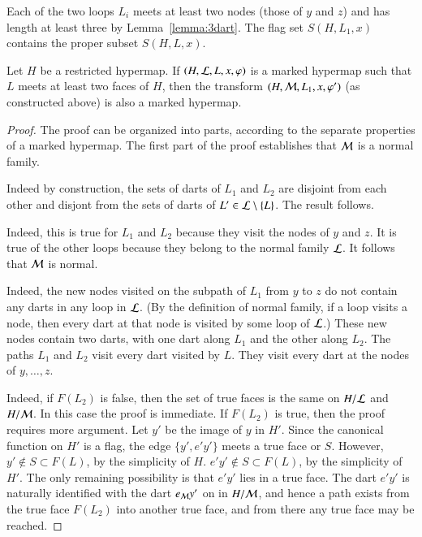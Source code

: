 Each of the two
loops $L_i$ meets at least two nodes (those
of $y$ and $z$) and has length at least three by
Lemma~\ref{lemma:3dart}.  
The flag set $S(H,L_1,x)$ contains the proper subset $S(H,L,x)$.




\begin{lemma}  
Let $H$ be a restricted hypermap.
If $(H,{\cal L},L,x,\varphi)$ is a marked hypermap such that $L$
meets at least two faces of $H$,  then the transform
$(H,{\cal M},L_1,x,\varphi')$ (as constructed above)
is also a marked hypermap.
\end{lemma}

\begin{proof} The proof can be organized into parts, according
to the separate properties of a marked hypermap.
The first part of the proof establishes that ${\cal M}$ is a normal family.

 
Indeed by construction, the sets of darts of $L_1$ and $L_2$
are disjoint from each other and disjont from the sets of darts of $L'\in
{\cal L}\setminus \{L\}$.  The result follows.

   Indeed, this
is true for $L_1$ and $L_2$ because they visit the nodes of $y$ and
$z$.  It is true of the other loops because they belong to the
normal family ${\cal L}$. It follows that ${\cal M}$ is normal.

   Indeed, the new nodes visited on the
subpath of $L_1$ from $y$ to $z$ do not contain any darts in any
loop in ${\cal L}$.  (By the definition of normal family, if a loop
visits a node, then every dart at that node is visited by some loop
of ${\cal L}$.)  These new nodes contain two darts, with one dart
along $L_1$ and the other along $L_2$.  The paths $L_1$ and $L_2$
visit every dart visited by $L$.  They visit every dart at the nodes
of $y,\ldots,z$.

   Indeed, if $F(L_2)$ is
false, then the set of true faces is the same on $H/{\cal L}$ and
$H/{\cal M}$.  In this case the proof is immediate.  If $F(L_2)$ is
true, then the proof requires more argument.  Let $y'$ be the image
of $y$ in $H'$.  Since the canonical function on $H'$ is a flag, the
edge $\{y',e'y'\}$ meets a true face or $S$.  However, $y'\not\in
S\subset F(L)$, by the simplicity of $H$.  $e'y'\not\in S \subset
F(L)$, by the simplicity of $H'$.  The only remaining possibility is
that $e'y'$ lies in a true face.  The dart $e'y'$ is naturally
identified with the dart $e_{\cal M} y'$ on in $H/{\cal M}$, and
hence a path exists from the true face $F(L_2)$ into another true
face, and from there any true face may be reached.


\end{proof}
